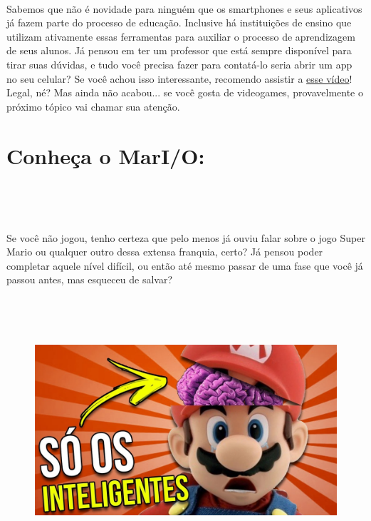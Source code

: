 \documentclass[12pt]{article}
\begin{document}
\
            
    Sabemos que não é novidade para ninguém que os smartphones e seus aplicativos já
fazem parte do processo de educação. Inclusive há instituições de ensino que utilizam ativamente
essas ferramentas para auxiliar o processo de aprendizagem de seus alunos.
Já pensou em ter um professor que está sempre disponível para tirar
suas dúvidas, e tudo você precisa fazer para contatá-lo seria abrir um
app no seu celular? Se você achou isso interessante, recomendo
assistir a \href{https://www.youtube.com/watch?v=Gjm1xgJVij4}{esse vídeo}!\\

Legal, né? Mas ainda não acabou... se você gosta de
videogames, provavelmente o próximo tópico vai chamar sua atenção.
           \section*{\centering \textbf{Conheça o MarI/O:}}\label{sec:MarI/O}
\

\

Se você não jogou, tenho certeza que pelo menos já ouviu falar sobre o
jogo Super Mario ou qualquer outro dessa extensa franquia, certo?
Já pensou poder completar aquele nível difícil, ou então até mesmo
passar de uma fase que você já passou antes, mas esqueceu de
salvar?

\

\


            \begin{figure}[ht]
            \label{fig:classificação}
            \centering
            \includegraphics[scale=0.3]{ldo-2.jpg}               
            \end{figure}
            
\
\end{document}
